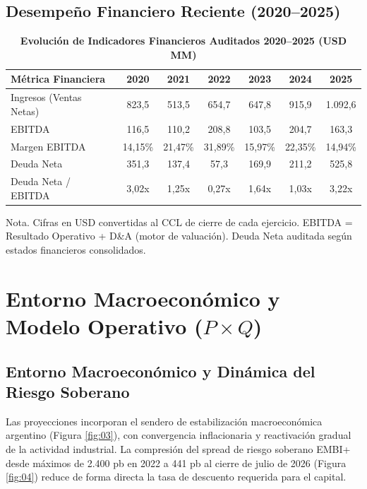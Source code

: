 \documentclass[11pt,a4paper]{article}
\begin{document}
\subsection{Desempeño Financiero Reciente (2020--2025)}
\begin{table}[H]
\centering
\caption{\textbf{Evolución de Indicadores Financieros Auditados 2020–2025 (USD MM)}}
\small
\begin{tabular}{lcccccc}
\toprule
\textbf{Métrica Financiera} & \textbf{2020} & \textbf{2021} & \textbf{2022} & \textbf{2023} & \textbf{2024} & \textbf{2025} \\
\midrule
Ingresos (Ventas Netas) & 823,5 & 513,5 & 654,7 & 647,8 & 915,9 & 1.092,6 \\
EBITDA & 116,5 & 110,2 & 208,8 & 103,5 & 204,7 & 163,3 \\
Margen EBITDA & 14,15\% & 21,47\% & 31,89\% & 15,97\% & 22,35\% & 14,94\% \\
Deuda Neta & 351,3 & 137,4 & 57,3 & 169,9 & 211,2 & 525,8 \\
Deuda Neta / EBITDA & 3,02x & 1,25x & 0,27x & 1,64x & 1,03x & 3,22x \\
\bottomrule
\end{tabular}
\end{table}

\noindent
{\tiny Nota. Cifras en USD convertidas al CCL de cierre de cada ejercicio. EBITDA = Resultado Operativo + D\&A (motor de valuación). Deuda Neta auditada según estados financieros consolidados.\par}

\section{Entorno Macroeconómico y Modelo Operativo \texorpdfstring{($P \times Q$)}{(P x Q)}}

\subsection{Entorno Macroeconómico y Dinámica del Riesgo Soberano}
Las proyecciones incorporan el sendero de estabilización macroeconómica argentino (Figura \ref{fig:03}), con convergencia inflacionaria y reactivación gradual de la actividad industrial. La compresión del spread de riesgo soberano EMBI+ desde máximos de 2.400 pb en 2022 a 441 pb al cierre de julio de 2026 (Figura \ref{fig:04}) reduce de forma directa la tasa de descuento requerida para el capital.
\end{document}
